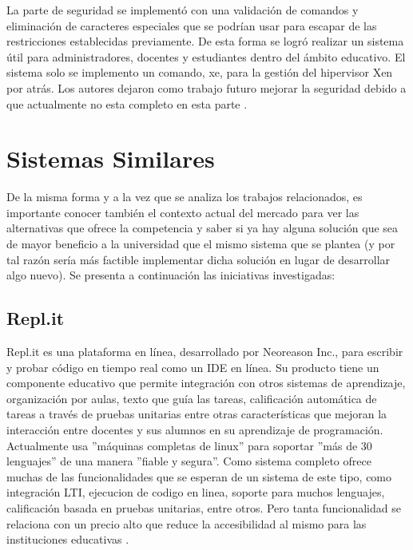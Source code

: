 La parte de seguridad se implementó con una validación de comandos y eliminación de caracteres especiales que se podrían usar para escapar de las restricciones establecidas previamente. De esta forma se logró realizar un sistema útil para administradores, docentes y estudiantes dentro del ámbito educativo. El sistema solo se implemento un comando, xe, para la gestión del hipervisor Xen por atrás. Los autores dejaron como trabajo futuro mejorar la seguridad debido a que actualmente no esta completo en esta parte \citep{almurayh2014xen}.
    

\section{Sistemas Similares}
De la misma forma y a la vez que se analiza los trabajos relacionados, es importante conocer también el contexto actual del mercado para ver las alternativas que ofrece la competencia y saber si ya hay alguna solución que sea de mayor beneficio a la universidad que el mismo sistema que se plantea (y por tal razón sería más factible implementar dicha solución en lugar de desarrollar algo nuevo). Se presenta a continuación las iniciativas investigadas:

  
\subsection{Repl.it}
Repl.it es una plataforma en línea, desarrollado por Neoreason Inc., para escribir y probar código en tiempo real como un IDE en línea. Su producto tiene un componente educativo que permite integración con otros sistemas de aprendizaje, organización por aulas, texto que guía las tareas, calificación automática de tareas a través de pruebas unitarias entre otras características que mejoran la interacción entre docentes y sus alumnos en su aprendizaje de programación. Actualmente usa ''máquinas completas de linux'' para soportar ''más de 30 lenguajes'' de una manera ''fiable y segura''. Como sistema completo ofrece muchas de las funcionalidades que se esperan de un sistema de este tipo, como integración LTI,  ejecucion de codigo en linea, soporte para muchos lenguajes, calificación basada en pruebas unitarias, entre otros. Pero tanta funcionalidad se relaciona con un precio alto que reduce la accesibilidad al mismo para las instituciones educativas \citep{Repl.it-Home}.
 

